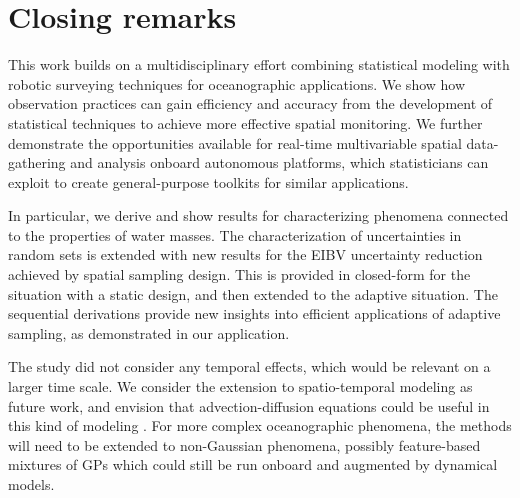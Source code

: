 \documentclass[aoas]{imsart}
\begin{document}
\section{Closing remarks}\label{sec:concl_disc}

This work builds on a multidisciplinary effort combining statistical
modeling with robotic surveying techniques for oceanographic
applications. We show how observation practices can gain efficiency
and accuracy from the development of statistical techniques to achieve
more effective spatial monitoring. We further demonstrate the
opportunities available for real-time multivariable spatial
data-gathering and analysis onboard autonomous platforms, which
statisticians can exploit to create general-purpose toolkits for
similar applications.

In particular, we derive and show results for characterizing phenomena
connected to the properties of water masses. The characterization of
uncertainties in random sets is extended with new results for the EIBV
uncertainty reduction achieved by spatial sampling design. This is
provided in closed-form for the situation with a static design, and
then extended to the adaptive situation. The sequential derivations
provide new insights into efficient applications of adaptive sampling,
as demonstrated in our application.

The study did not consider any temporal effects, which would be
relevant on a larger time scale. We consider the extension to
spatio-temporal modeling as future work, and envision that
advection-diffusion equations could be useful in this kind of modeling
\citep{sigrist2015stochastic}. For more complex oceanographic
phenomena, the methods will need to be extended to non-Gaussian
phenomena, possibly feature-based mixtures of GPs which could still be
run onboard and augmented by dynamical models. 
\end{document}

